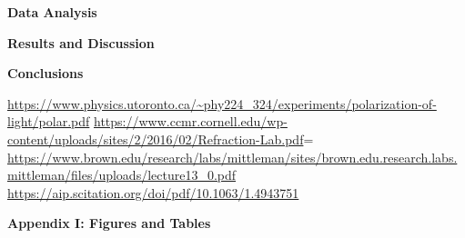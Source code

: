 \documentclass[11pt]{article}
\begin{document}
\begin{multicols}{2}
    

    \vspace{10pt}

     \selectfont \textbf{Data Analysis}
    
     \selectfont 
    



    \vspace{10pt}

     \selectfont \textbf{Results and Discussion}
    
     \selectfont 



    \vspace{10pt}

     \selectfont \textbf{Conclusions}
    
     \selectfont 




\end{multicols}

    \vspace{10pt}
     
     \selectfont

    \begin{thebibliography}{} \selectfont
        \url{https://www.physics.utoronto.ca/~phy224_324/experiments/polarization-of-light/polar.pdf}
        \url{https://www.ccmr.cornell.edu/wp-content/uploads/sites/2/2016/02/Refraction-Lab.pdf}=
        \url{https://www.brown.edu/research/labs/mittleman/sites/brown.edu.research.labs.mittleman/files/uploads/lecture13_0.pdf}
        \url{https://aip.scitation.org/doi/pdf/10.1063/1.4943751}
    \end{thebibliography}




    \pagebreak 



     \selectfont \textbf{Appendix I: Figures and Tables}
    
     \selectfont
\end{document}
